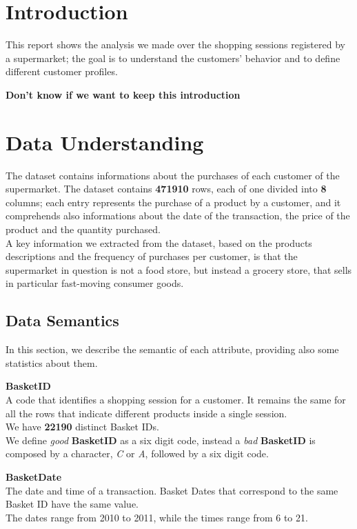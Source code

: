 \section{Introduction}

This report shows the analysis we made over the shopping sessions registered by a supermarket; the goal is to understand the customers' behavior and to define different customer profiles.

\textbf{Don't know if we want to keep this introduction}
\pagebreak

\section{Data Understanding}

The dataset contains informations about the purchases of each customer of the supermarket. The dataset contains \textbf{471910} rows, each of one divided into \textbf{8} columns; each entry represents the purchase of a product by a customer, and it comprehends also informations about the date of the transaction, the price of the product and the quantity purchased.\\
A key information we extracted from the dataset, based on the products descriptions and the frequency of purchases per customer, is that the supermarket in question is not a food store, but instead a grocery store, that sells in particular fast-moving consumer goods.

\subsection{Data Semantics}

In this section, we describe the semantic of each attribute, providing also some statistics about them.

\textbf{BasketID} \\
A code that identifies a shopping session for a customer. It remains the same for all the rows that indicate different products inside a single session.\\
We have \textbf{22190} distinct Basket IDs.\\
We define \emph{good} \textbf{BasketID} as a six digit code, instead a \emph{bad} \textbf{BasketID} is composed by a character, \emph{C} or \emph{A}, followed by a six digit code.

\textbf{BasketDate}\\
The date and time of a transaction. Basket Dates that correspond to the same Basket ID have the same value.\\
The dates range from 2010 to 2011, while the times range from 6 to 21.

